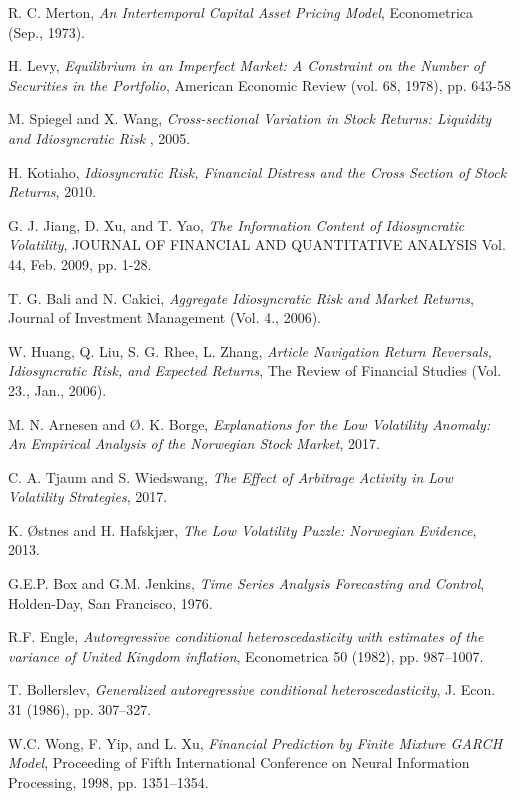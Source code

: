 \begin{thebibliography}{9}
R. C. Merton, \textit{An Intertemporal Capital Asset Pricing Model}, Econometrica (Sep., 1973).

H. Levy, \textit{Equilibrium in an Imperfect Market: A Constraint on the Number of Securities in the Portfolio}, American Economic Review (vol. 68, 1978), pp. 643-58

M. Spiegel and X. Wang, \textit{Cross-sectional Variation in Stock Returns:
Liquidity and Idiosyncratic Risk }, 2005.

H. Kotiaho, \textit{Idiosyncratic Risk, Financial Distress
and the Cross Section of Stock Returns}, 2010.

G. J. Jiang, D. Xu, and T. Yao, \textit{The Information Content of Idiosyncratic Volatility}, JOURNAL OF FINANCIAL AND QUANTITATIVE ANALYSIS Vol. 44, Feb. 2009, pp. 1-28.

T. G. Bali and N. Cakici, \textit{Aggregate Idiosyncratic Risk and Market Returns}, Journal of Investment Management (Vol. 4., 2006).

W. Huang, Q. Liu, S. G. Rhee, L. Zhang, \textit{Article Navigation
Return Reversals, Idiosyncratic Risk, and Expected Returns}, The Review of Financial Studies (Vol. 23., Jan., 2006).

M. N. Arnesen and Ø. K. Borge, \textit{Explanations for the Low Volatility Anomaly: An Empirical Analysis of the Norwegian Stock Market}, 2017.

C. A. Tjaum and S. Wiedswang, \textit{The Effect of Arbitrage Activity in
Low Volatility Strategies}, 2017.

K. Østnes and H. Hafskjær, \textit{The Low Volatility Puzzle:
Norwegian Evidence}, 2013.


G.E.P. Box and G.M. Jenkins, \textit{Time Series Analysis Forecasting and Control}, Holden-Day, San Francisco, 1976.

R.F. Engle, \textit{Autoregressive conditional heteroscedasticity with estimates of the variance of United Kingdom inflation}, Econometrica 50 (1982), pp. 987–1007.

T. Bollerslev, \textit{Generalized autoregressive conditional heteroscedasticity}, J. Econ. 31 (1986), pp. 307–327.

W.C. Wong, F. Yip, and L. Xu, \textit{Financial Prediction by Finite Mixture GARCH Model}, Proceeding of Fifth International Conference on Neural Information Processing, 1998, pp. 1351–1354.


\end{thebibliography}

